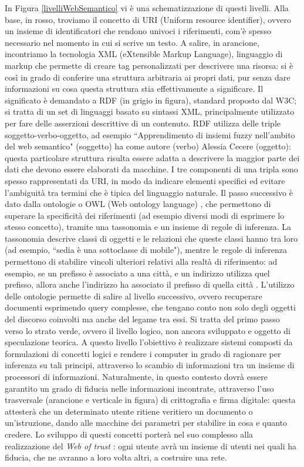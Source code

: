 \documentclass[12pt,a4paper]{report}
\begin{document}
In Figura \ref{livelliWebSemantico} vi è una schematizzazione di questi livelli. 
Alla base, in rosso, troviamo il concetto di URI (Uniform resource identifier), ovvero un insieme di identificatori che rendono univoci i riferimenti, com'è spesso necessario nel momento in cui si scrive un testo.
A salire, in arancione, incontriamo la tecnologia XML \cite{xmlBook} (eXtensible Markup Language), linguaggio di markup che permette di creare tag personalizzati per descrivere una risorsa: si è così in grado di conferire una struttura arbitraria ai propri dati, pur senza dare informazioni su cosa questa struttura stia effettivamente a significare.
Il significato è demandato a RDF \cite{rdfBook} (in grigio in figura), standard proposto dal W3C; si tratta di un set di linguaggi basato su sintassi XML, principalmente utilizzato per fare delle asserzioni descrittive di un contenuto. RDF utilizza delle triple soggetto-verbo-oggetto, ad esempio ``Apprendimento di insiemi fuzzy nell'ambito del web semantico" (soggetto) ha come autore (verbo) Alessia Cecere (oggetto): questa particolare struttura risulta essere adatta a descrivere la maggior parte dei dati che devono essere elaborati da macchine.
I tre componenti di una tripla sono spesso rappresentati da URI, in modo da indicare elementi specifici ed evitare l'ambiguità tra termini che è tipica del linguaggio naturale.
Il passo successivo è dato dalla ontologie o OWL (Web ontology language) \cite{semanticWebPage}, che permettono di superare la specificità dei riferimenti (ad esempio diversi modi di esprimere lo stesso concetto), tramite una tassonomia e un insieme di regole di inferenza. La tassonomia descrive classi di oggetti e le relazioni che queste classi hanno tra loro (ad esempio, ``sedia è una sottoclasse di mobile"), mentre le regole di inferenza permettono di stabilire vincoli ulteriori relativi alla realtà di riferimento: ad esempio, se un prefisso è associato a una città, e un indirizzo utilizza quel prefisso, allora anche l'indirizzo ha associato il prefisso di quella città \cite{semanticWebPaper}. 
L'utilizzo delle ontologie permette di salire al livello successivo, ovvero recuperare documenti esprimendo query complesse, che tengano conto non solo degli oggetti del discorso coinvolti ma anche del legame tra essi.
Si tratta del primo passo verso lo strato verde, ovvero il livello logico, non ancora sviluppato e oggetto di speculazione teorica. A questo livello l'obiettivo è realizzare sistemi composti da formulazioni di concetti logici e rendere i computer in grado di ragionare per inferenza su tali principi, attraverso lo scambio di informazioni tra un insieme di processori di informazioni. Naturalmente, in questo contesto dovrà essere garantito un grado di fiducia nelle informazioni incontrate, attraverso l'uso trasversale (arancione e verticale in figura) di crittografia e firma digitale: questa attesterà che un determinato utente ritiene veritiero un documento o un'istruzione, dando alle macchine dei parametri per stabilire in cosa e quanto credere.
Lo sviluppo di questi concetti porterà nel suo complesso alla realizzazione del \emph{Web of trust} \cite{semanticWebPage}: ogni utente avrà un insieme di utenti nei quali ha fiducia, che ne avranno a loro volta altri, a costruire una rete.
\end{document}
